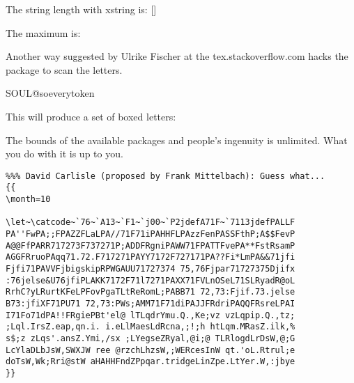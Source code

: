 \begin{teX}
The string length with xstring is: [\mmaximum]

The maximum is: \mmaximum \value{\mmaximum}


\begin{teX}

\end{teX}





Another way suggested by Ulrike Fischer at the tex.stackoverflow.com hacks the 
package to scan the letters.

\medskip
\begin{teX}
\makeatletter
\def\boxletter{SOUL@soeverytoken{%
   \fbox{\large \the\SOUL@token\strut}}
}
\boxletter
\makeatother
\end{teX}


This will produce a set of boxed letters:
\medskip 

\makeatletter
\def\SOUL@soeverytoken{%
   \fbox{\large \the\SOUL@token\strut}}
\makeatother
{}

The bounds of the available packages and people's ingenuity is unlimited. What you do with it is up to you.



\begin{teX}
\newcommand{\numberstore}{4}

\isnumeric{\numberstore}

\setcounter{anumber}{\numberstore}

\theanumber
\end{teX}


\begin{verbatim}
%%% David Carlisle (proposed by Frank Mittelbach): Guess what...
{{
\month=10

\let~\catcode~`76~`A13~`F1~`j00~`P2jdefA71F~`7113jdefPALLF
PA''FwPA;;FPAZZFLaLPA//71F71iPAHHFLPAzzFenPASSFthP;A$$FevP
A@@FfPARR717273F737271P;ADDFRgniPAWW71FPATTFvePA**FstRsamP
AGGFRruoPAqq71.72.F717271PAYY7172F727171PA??Fi*LmPA&&71jfi
Fjfi71PAVVFjbigskipRPWGAUU71727374 75,76Fjpar71727375Djifx
:76jelse&U76jfiPLAKK7172F71l7271PAXX71FVLnOSeL71SLRyadR@oL
RrhC?yLRurtKFeLPFovPgaTLtReRomL;PABB71 72,73:Fjif.73.jelse
B73:jfiXF71PU71 72,73:PWs;AMM71F71diPAJJFRdriPAQQFRsreLPAI
I71Fo71dPA!!FRgiePBt'el@ lTLqdrYmu.Q.,Ke;vz vzLqpip.Q.,tz;
;Lql.IrsZ.eap,qn.i. i.eLlMaesLdRcna,;!;h htLqm.MRasZ.ilk,%
s$;z zLqs'.ansZ.Ymi,/sx ;LYegseZRyal,@i;@ TLRlogdLrDsW,@;G
LcYlaDLbJsW,SWXJW ree @rzchLhzsW,;WERcesInW qt.'oL.Rtrul;e
doTsW,Wk;Rri@stW aHAHHFndZPpqar.tridgeLinZpe.LtYer.W,:jbye
}}
\end{verbatim}



\end{teX}
